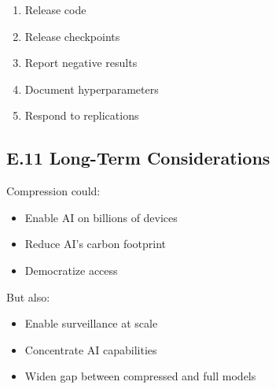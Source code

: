 \begin{enumerate}
\item Release code
\item Release checkpoints
\item Report negative results
\item Document hyperparameters
\item Respond to replications

\end{enumerate}
\subsection{E.11 Long-Term Considerations}

Compression could:

\begin{itemize}
\item Enable AI on billions of devices
\item Reduce AI's carbon footprint
\item Democratize access

\end{itemize}
But also:

\begin{itemize}
\item Enable surveillance at scale
\item Concentrate AI capabilities
\item Widen gap between compressed and full models
\end{itemize}